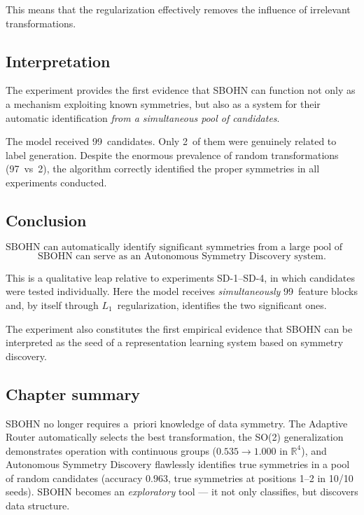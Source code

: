 \documentclass[11pt,a4paper]{report}
\begin{document}
This means that the regularization effectively removes the influence of irrelevant transformations.

\subsection{Interpretation}

The experiment provides the first evidence that SBOHN can function not only as a mechanism exploiting known symmetries, but also as a system for their automatic identification \emph{from a simultaneous pool of candidates}.

The model received 99~candidates. Only 2~of them were genuinely related to label generation. Despite the enormous prevalence of random transformations (97~vs~2), the algorithm correctly identified the proper symmetries in all experiments conducted.

\subsection{Conclusion}

\[
\boxed{\text{SBOHN can automatically identify significant symmetries from a large pool of candidates.}}
\]
\[
\boxed{\text{SBOHN can serve as an Autonomous Symmetry Discovery system.}}
\]

This is a qualitative leap relative to experiments SD-1--SD-4, in which candidates were tested individually. Here the model receives \emph{simultaneously} 99~feature blocks and, by itself through $L_1$~regularization, identifies the two significant ones.

The experiment also constitutes the first empirical evidence that SBOHN can be interpreted as the seed of a representation learning system based on symmetry discovery.




\subsection*{Chapter summary}
SBOHN no longer requires a~priori knowledge of data symmetry. The Adaptive Router automatically selects the best transformation, the SO(2) generalization demonstrates operation with continuous groups ($0.535 \to 1.000$ in $\mathbb{R}^4$), and Autonomous Symmetry Discovery flawlessly identifies true symmetries in a pool of random candidates (accuracy $0.963$, true symmetries at positions 1--2 in 10/10 seeds). SBOHN becomes an \emph{exploratory} tool --- it not only classifies, but discovers data structure.
\end{document}
